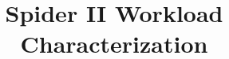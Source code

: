 \documentclass{sig-alternate}
\begin{document}
\title{Spider II Workload Characterization}
%
%
%
%
%

%
\author{
}

\maketitle



 



\nocite{reference}


\end{document}
